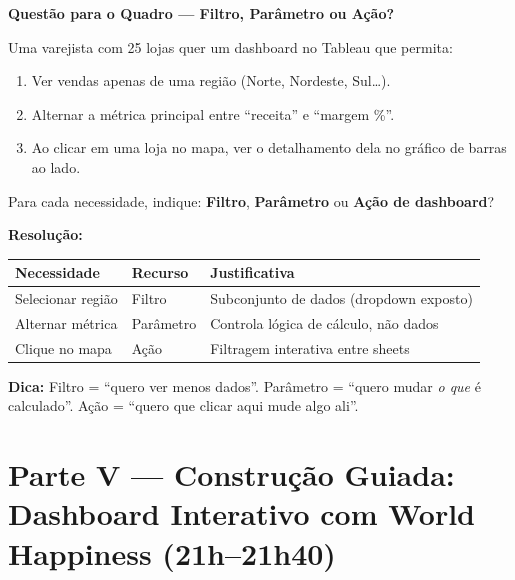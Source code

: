\begin{SolvedBox}
\textbf{Questão para o Quadro — Filtro, Parâmetro ou Ação?}

Uma varejista com 25 lojas quer um dashboard no Tableau que permita:
\begin{enumerate}
  \item Ver vendas apenas de uma região (Norte, Nordeste, Sul\ldots).
  \item Alternar a métrica principal entre ``receita'' e ``margem \%''.
  \item Ao clicar em uma loja no mapa, ver o detalhamento dela no
  gráfico de barras ao lado.
\end{enumerate}

Para cada necessidade, indique: \textbf{Filtro}, \textbf{Parâmetro}
ou \textbf{Ação de dashboard}?

\textbf{Resolução:}
\begin{center}
\begin{tabular}{|l|l|p{6.5cm}|}
\hline
\textbf{Necessidade} & \textbf{Recurso} & \textbf{Justificativa} \\
\hline
Selecionar região & Filtro & Subconjunto de dados (dropdown exposto) \\
\hline
Alternar métrica & Parâmetro & Controla lógica de cálculo, não dados \\
\hline
Clique no mapa & Ação & Filtragem interativa entre sheets \\
\hline
\end{tabular}
\end{center}

\textbf{Dica:} Filtro = ``quero ver menos dados''. Parâmetro =
``quero mudar \emph{o que} é calculado''. Ação = ``quero que clicar
aqui mude algo ali''.
\end{SolvedBox}

\section{Parte V — Construção Guiada: Dashboard Interativo com World Happiness (21h–21h40)}

